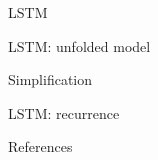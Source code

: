 \documentclass[10pt]{beamer}
\begin{document}
\begin{frame}{LSTM}

\end{frame}


\begin{frame}{LSTM: unfolded model}

\end{frame}


\begin{frame}{Simplification}

\end{frame}


\begin{frame}{LSTM: recurrence}

\end{frame}


\begin{frame}[allowframebreaks]{References}

  
  

\end{frame}
\end{document}
